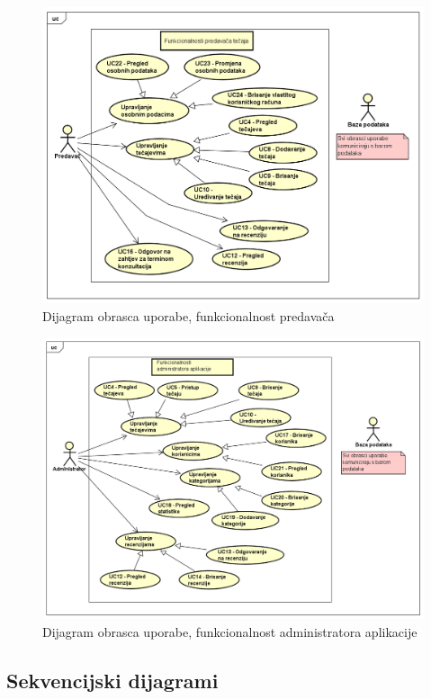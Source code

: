 					\begin{figure}[h]
						\includegraphics[scale=0.6]{dijagrami/UML_pred.PNG}
						\centering
						\caption{Dijagram obrasca uporabe, funkcionalnost predavača}
						\label{fig:UML_pred}
					\end{figure}
				\eject	
					\begin{figure}[h]
						\includegraphics[scale=0.5]{dijagrami/UML_ad.PNG}
						\centering
						\caption{Dijagram obrasca uporabe, funkcionalnost administratora aplikacije}
						\label{fig:UML_ad}
					\end{figure}
				\eject		
				
			\subsection{Sekvencijski dijagrami}
				
